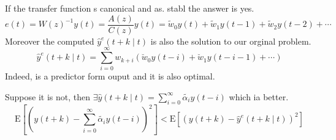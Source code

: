 If the transfer function s canonical and as. stabl the answer is yes.
$$
e(t)=W(z)^{-1} y(t)=\frac{A(z)}{C(z)} y(t)=\widetilde{w}_{0} y(t)+\widetilde{w}_{1} y(t-1)+\widetilde{w}_{2} y(t-2)+\cdots
$$
Moreover the computed $\hat{y}^e(t+k \mid t)$ is also the solution to our orginal problem.
$$
\hat{y}^e(t+k \mid t)=\sum_{i=0}^{\infty} w_{k+i}\left(\breve{w}_{0} y(t-i)+\breve{w}_{1} y(t-i-1)+\cdots\right)
$$
Indeed, is a predictor form ouput and it is also optimal.

Suppose it is not, then $\exists \hat{y}(t+k \mid t)=\sum_{i=0}^{\infty} \tilde{\alpha_i}y(t-i)$ which ia better.
$$
\mathrm{E}\left[(y(t+k)-\sum_{i=0}^{\infty} \tilde{\alpha_i}y(t-i))^2\right]<\mathrm{E}\left[(y(t+k)-\hat{y}^e(t+k \mid t))^{2}\right]
$$

 